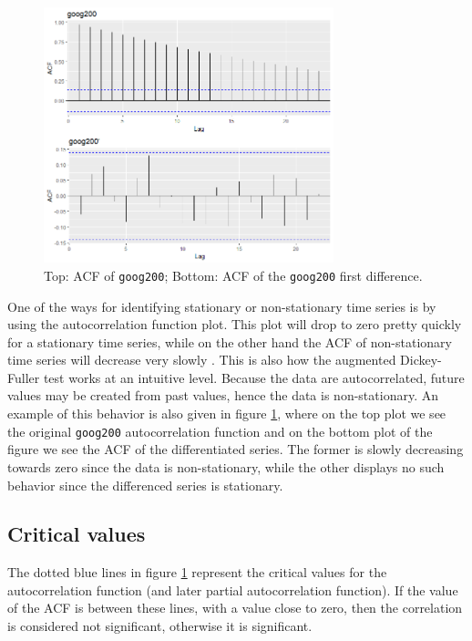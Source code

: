 \documentclass[12pt,a4paper,titlepage]{report}
\begin{document}
\begin{figure}[h]
    \centering
    \includegraphics[width=0.75\textwidth]{dgoog200acf}
    \caption{Top: ACF of \texttt{goog200}; Bottom: ACF of the \texttt{goog200} first difference.}
    \label{goog200acf}
\end{figure}

One of the ways for identifying stationary or non-stationary time series is by using the autocorrelation function plot. This plot will drop to zero pretty quickly for a stationary time series, while on the other hand the ACF of non-stationary time series will decrease very slowly \cite{fpp2stationarity}. This is also how the augmented Dickey-Fuller test works at an intuitive level. Because the data are autocorrelated, future values may be created from past values, hence the data is non-stationary. An example of this behavior is also given in figure \ref{goog200acf}, where on the top plot we see the original \texttt{goog200} autocorrelation function and on the bottom plot of the figure we see the ACF of the differentiated series. The former is slowly decreasing towards zero since the data is non-stationary, while the other displays no such behavior since the differenced series is stationary.

\subsection{Critical values} \label{cirticalvaluesection}

The dotted blue lines in figure \ref{goog200acf} represent the critical values for the autocorrelation function (and later partial autocorrelation function). If the value of the ACF is between these lines, with a value close to zero, then the correlation is considered not significant, otherwise it is significant.
\end{document}
